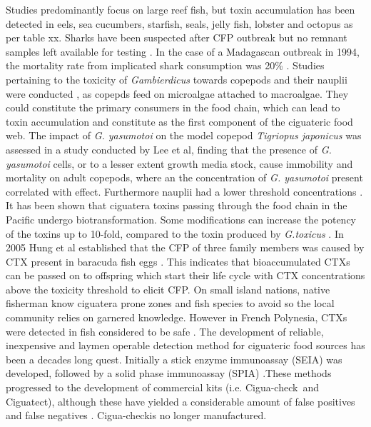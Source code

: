 \documentclass[12pt]{article}
\begin{document}
Studies predominantly focus on large reef fish, but toxin accumulation has been detected in eels, sea cucumbers, starfish, seals, jelly fish, lobster and octopus as per table xx. %
Sharks have been suspected after CFP outbreak but no remnant samples left available for testing \cite{boisier1995fatal,lehane2000ciguatera,habermehl1994severe}. In the case of a Madagascan outbreak in 1994, the mortality rate from implicated shark consumption was 20\% \cite{habermehl1994severe}. 
Studies pertaining to the toxicity of \emph{Gambierdicus} towards copepods and their nauplii were conducted \cite{lee2014toxicity}, as copepds feed on microalgae attached to macroalgae. They could constitute the primary consumers in the food chain, which can lead to toxin accumulation \cite{raisuddin2007copepod} and constitute as the first component of the ciguateric food web. The impact of \emph{G. yasumotoi} on the model copepod \emph{Tigriopus japonicus} was assessed in a study conducted by Lee et al, finding that the presence of \emph{G. yasumotoi} cells, or to a lesser extent growth media stock, cause immobility and mortality on adult copepods, where an the concentration of \emph{G. yasumotoi} present correlated with effect. Furthermore nauplii had a lower threshold concentrations \cite{lee2014toxicity}.
It has been shown that ciguatera toxins passing through the food chain in the Pacific undergo biotransformation. %
Some modifications can increase the potency of the toxins up to 10-fold, compared to the toxin produced by \textit{G.toxicus} \cite{lewis2006ciguatera}.
In 2005 Hung et al established that the CFP of three family members was caused by CTX present in baracuda fish eggs \cite{hung2005persistent}. This indicates that bioaccumulated CTXs can be passed on to offspring which start their life cycle with CTX concentrations above the toxicity threshold to elicit CFP. %
On small island nations, native fisherman know ciguatera prone zones and fish species to avoid so the local community relies on garnered knowledge. However in French Polynesia, CTXs were detected in fish considered to be safe \cite{darius2007ciguatera}.
The development of reliable, inexpensive and laymen operable detection method for ciguateric food sources has been a decades long quest. Initially a stick enzyme immunoassay (SEIA) \cite{hokama1985rapid} was developed, followed by a solid phase immunoassay (SPIA) \cite{hokama1990simplified}.These methods progressed to the development of commercial kits (i.e. Cigua-check\textregistered \ and Ciguatect\textregistered), although these have yielded a considerable amount of false positives and false negatives \cite{wong2005study}. Cigua-check\textregistered is no longer manufactured.%
\end{document}
